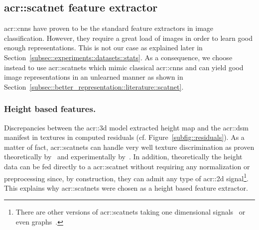     \subsection{\texorpdfstring{\acrshort*{acr::scatnet}}{ScatNet} feature extractor}
        \label{subsec::better_representation::evaluation::image}
        \glspl{acr::cnn} have proven to be the standard feature extractors in image classification.
        However, they require a great load of images in order to learn good enough representations.
        This is not our case as explained later in Section~\ref{subsec::experiments::datasets::stats}.
        As a consequence, we choose instead to use \glspl{acr::scatnet} which mimic classical \glspl{acr::cnn} and can yield good image representations in an unlearned manner as shown in Section~\ref{subsec::better_representation::literature::scatnet}.

        \subsubsection{Height based features.}
            Discrepancies between the \gls{acr::3d} model extracted height map and the \gls{acr::dsm} manifest in textures in computed residuals (cf. Figure~\ref{subfig::residuals}).
            As a matter of fact, \glspl{acr::scatnet} can handle very well texture discrimination as proven theoretically by~\textcite{mallat2012group} and experimentally by~\textcite{bruna2013invariant,sifre2013rotation}.
            In addition, theoretically the height data can be fed directly to a \gls{acr::scatnet} without requiring any normalization or preprocessing since, by construction, they can admit any type of \gls{acr::2d} signal\footnote{There are other versions of \glspl{acr::scatnet} taking one dimensional signals~\parencite{anden2014deep} or even graphs~\parencite{eickenberg2018solid}.}.
            This explains why \glspl{acr::scatnet} were chosen as a height based feature extractor.\\

